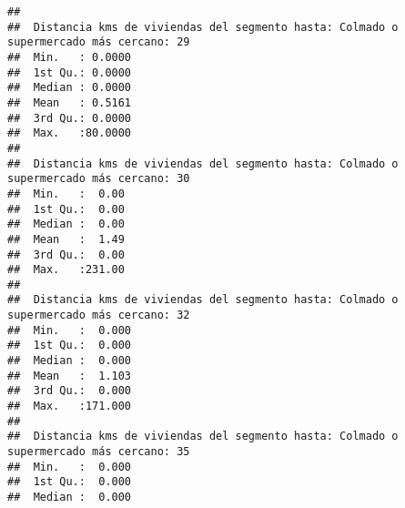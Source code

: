 \documentclass[11pt,]{article}
\begin{document}
\begin{verbatim}
##                                                                                       
##  Distancia kms de viviendas del segmento hasta: Colmado o supermercado más cercano: 29
##  Min.   : 0.0000                                                                      
##  1st Qu.: 0.0000                                                                      
##  Median : 0.0000                                                                      
##  Mean   : 0.5161                                                                      
##  3rd Qu.: 0.0000                                                                      
##  Max.   :80.0000                                                                      
##                                                                                       
##  Distancia kms de viviendas del segmento hasta: Colmado o supermercado más cercano: 30
##  Min.   :  0.00                                                                       
##  1st Qu.:  0.00                                                                       
##  Median :  0.00                                                                       
##  Mean   :  1.49                                                                       
##  3rd Qu.:  0.00                                                                       
##  Max.   :231.00                                                                       
##                                                                                       
##  Distancia kms de viviendas del segmento hasta: Colmado o supermercado más cercano: 32
##  Min.   :  0.000                                                                      
##  1st Qu.:  0.000                                                                      
##  Median :  0.000                                                                      
##  Mean   :  1.103                                                                      
##  3rd Qu.:  0.000                                                                      
##  Max.   :171.000                                                                      
##                                                                                       
##  Distancia kms de viviendas del segmento hasta: Colmado o supermercado más cercano: 35
##  Min.   :  0.000                                                                      
##  1st Qu.:  0.000                                                                      
##  Median :  0.000                                                                      

\end{verbatim}
\end{document}
